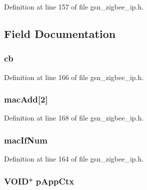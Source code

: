 Definition at line 157 of file gsn\_\-zigbee\_\-ip.h.



\subsection{Field Documentation}
\hypertarget{a00438_abe44915a1959b03524b5b861b2374024}{
\subsubsection[{cb}]{ {\bf cb}}}
\label{a00438_abe44915a1959b03524b5b861b2374024}


Definition at line 166 of file gsn\_\-zigbee\_\-ip.h.

\hypertarget{a00438_a25cba5997ae9dca53bc0838fe7da1ef5}{
\subsubsection[{macAdd}]{ {\bf macAdd}\mbox{[}2\mbox{]}}}
\label{a00438_a25cba5997ae9dca53bc0838fe7da1ef5}


Definition at line 168 of file gsn\_\-zigbee\_\-ip.h.

\hypertarget{a00438_ae57ae92e651751e7978e237c55133b4c}{
\subsubsection[{macIfNum}]{ {\bf macIfNum}}}
\label{a00438_ae57ae92e651751e7978e237c55133b4c}


Definition at line 164 of file gsn\_\-zigbee\_\-ip.h.

\hypertarget{a00438_a05a138152af2aedc27575fbb40a5236a}{
\subsubsection[{pAppCtx}]{\setlength{\rightskip}{0pt plus 5cm}VOID$\ast$ {\bf pAppCtx}}}
\label{a00438_a05a138152af2aedc27575fbb40a5236a}


